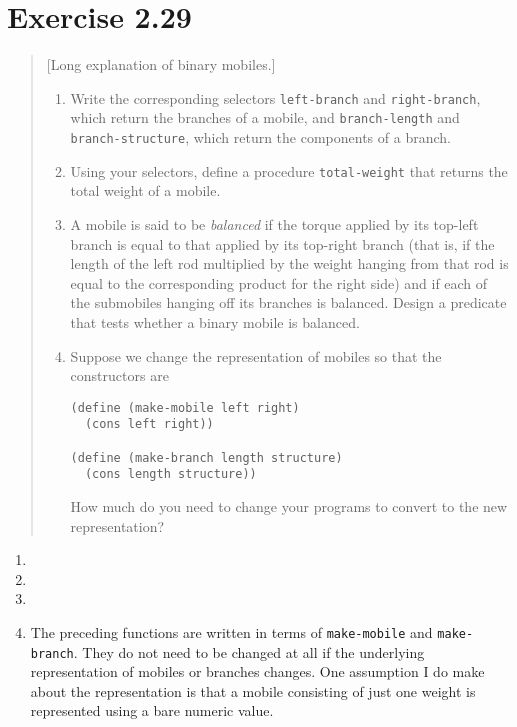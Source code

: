 \documentclass{article}
\begin{document}


\section{Exercise 2.29}
\begin{quote}
	[Long explanation of binary mobiles.]

    \begin{enumerate}
        \item Write the corresponding selectors \texttt{left-branch} and
            \texttt{right-branch}, which return the branches of a mobile, and
            \texttt{branch-length} and \texttt{branch-structure}, which return
            the components of a branch.
        \item Using your selectors, define a procedure \texttt{total-weight}
            that returns the total weight of a mobile.
        \item A mobile is said to be \emph{balanced} if the torque applied by
            its top-left branch is equal to that applied by its top-right
            branch (that is, if the length of the left rod multiplied by the
            weight hanging from that rod is equal to the corresponding product
            for the right side) and if each of the submobiles hanging off its
            branches is balanced. Design a predicate that tests whether a
            binary mobile is balanced.
        \item Suppose we change the representation of mobiles so that the
            constructors are
            \begin{lstlisting}
(define (make-mobile left right)
  (cons left right))

(define (make-branch length structure)
  (cons length structure))
            \end{lstlisting}
            How much do you need to change your programs to convert to the new
            representation?
    \end{enumerate}
\end{quote}

\begin{enumerate}
    \item 

    \item 

    \item 

    \item The preceding functions are written in terms of \texttt{make-mobile}
        and \texttt{make-branch}. They do not need to be changed at all if the
        underlying representation of mobiles or branches changes. One assumption
        I do make about the representation is that a mobile consisting of just
        one weight is represented using a bare numeric value.
\end{enumerate}
\end{document}
